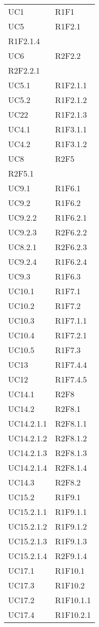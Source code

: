\begin{longtable}{|C{6.5cm}|C{6.5cm}|}
	\tabularnewline

	UC1 & R1F1 \\
	UC5 & \centering R1F2.1 \\ R1F2.1.4 \tabularnewline
	UC6 & \centering R2F2.2 \\ R2F2.2.1 \tabularnewline
	UC5.1 & R1F2.1.1 \\
	UC5.2 & R1F2.1.2 \\
	UC22 & R1F2.1.3 \\
	UC4.1 & R1F3.1.1 \\
	UC4.2 & R1F3.1.2 \\
	UC8 & \centering R2F5 \\ R2F5.1 \tabularnewline
	UC9.1 & R1F6.1 \\
    UC9.2 & R1F6.2 \\
    UC9.2.2 & R1F6.2.1 \\
    UC9.2.3 & R2F6.2.2 \\
    UC8.2.1 & R2F6.2.3 \\
    UC9.2.4 & R1F6.2.4 \\
	UC9.3 & R1F6.3 \\
	UC10.1 & R1F7.1 \\
	UC10.2 & R1F7.2 \\
	UC10.3 & R1F7.1.1 \\
	UC10.4 & R1F7.2.1 \\
	UC10.5 & R1F7.3 \\
	UC13 & R1F7.4.4 \\
	UC12 & R1F7.4.5 \\
	UC14.1 & R2F8 \\
	UC14.2 & R2F8.1 \\
	UC14.2.1.1 & R2F8.1.1 \\
	UC14.2.1.2 & R2F8.1.2 \\
	UC14.2.1.3 & R2F8.1.3 \\
	UC14.2.1.4 & R2F8.1.4 \\
	UC14.3 & R2F8.2 \\
	UC15.2 & R1F9.1 \\
	UC15.2.1.1 & R1F9.1.1 \\
	UC15.2.1.2 & R1F9.1.2 \\
	UC15.2.1.3 & R1F9.1.3 \\
	UC15.2.1.4 & R2F9.1.4 \\
	UC17.1 & R1F10.1 \\
	UC17.3 & R1F10.2 \\
	UC17.2 & R1F10.1.1 \\
	UC17.4 & R1F10.2.1 \\

\end{longtable}
